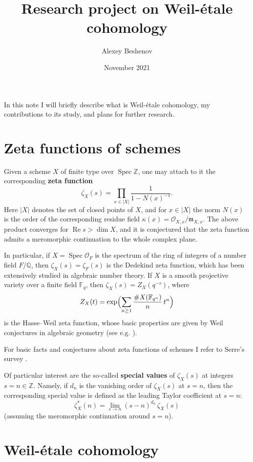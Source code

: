 \documentclass{article}
\author{Alexey Beshenov}
\date{November 2021}
\title{Research project on Weil-étale cohomology}
\DeclareMathOperator{\Spec}{Spec}
\newcommand{\ZZ}{\mathbb{Z}}
\newcommand{\FF}{\mathbb{F}}
\newcommand{\QQ}{\mathbb{Q}}
\renewcommand{\Re}{\operatorname{Re}}
\begin{document}
\maketitle

In this note I will briefly describe what is Weil-étale cohomology,
my contributions to its study, and plans for further research.

\section{Zeta functions of schemes}

Given a scheme $X$ of finite type over $\Spec \ZZ$, one may attach to it the
corresponding \textbf{zeta function}
$$\zeta_X (s) = \prod_{x \in |X|} \frac{1}{1 - N (x)^{-s}}.$$
Here $|X|$ denotes the set of closed points of $X$, and for $x \in |X|$ the norm
$N (x)$ is the order of the corresponding residue field
$\kappa (x) = \mathcal{O}_{X,x}/\mathfrak{m}_{X,x}$. The above product converges
for $\Re s > \dim X$, and it is conjectured that the zeta function admits a
meromorphic continuation to the whole complex plane.

In particular, if $X = \Spec \mathcal{O}_F$ is the spectrum of the ring of
integers of a number field $F/\QQ$, then $\zeta_X (s) = \zeta_F (s)$ is the
Dedekind zeta function, which has been extensively studied in algebraic number
theory. If $X$ is a smooth projective variety over a finite field $\FF_q$, then
$\zeta_X (s) = Z_X (q^{-s})$, where
$$Z_X (t) = \exp \Bigl(\sum_{n\ge 1} \frac{\# X (\FF_{q^n})}{n}\,t^n\Bigr)$$
is the Hasse--Weil zeta function, whose basic properties are given by Weil
conjectures in algebraic geometry (see e.g. \cite{Katz-Motives}).

For basic facts and conjectures about zeta functions of schemes I refer to
Serre's survey \cite{Serre-65}.

Of particular interest are the so-called \textbf{special values} of
$\zeta_X (s)$ at integers $s = n \in \ZZ$. Namely, if $d_n$ is the vanishing
order of $\zeta_X (s)$ at $s = n$, then the corresponding special value is
defined as the leading Taylor coefficient at $s = n$:
$$\zeta_X^* (n) = \lim_{s \to n} (s - n)^{d_n}\,\zeta_X (s)$$
(assuming the meromorphic continuation around $s = n$).

\section{Weil-étale cohomology}
\end{document}

